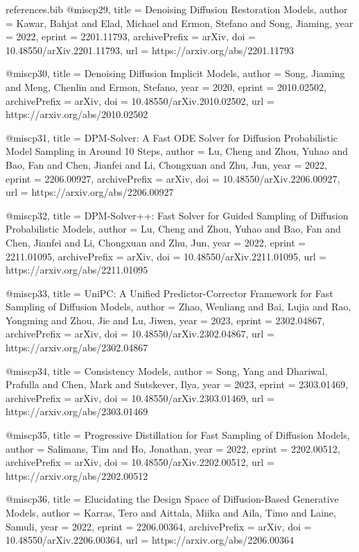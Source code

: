 \begin{filecontents*}{references.bib}
@misc{p29,
  title = {{Denoising Diffusion Restoration Models}},
  author = {Kawar, Bahjat and Elad, Michael and Ermon, Stefano and Song, Jiaming},
  year = {2022},
  eprint = {2201.11793},
  archivePrefix = {arXiv},
  doi = {10.48550/arXiv.2201.11793},
  url = {https://arxiv.org/abs/2201.11793}
}

@misc{p30,
  title = {{Denoising Diffusion Implicit Models}},
  author = {Song, Jiaming and Meng, Chenlin and Ermon, Stefano},
  year = {2020},
  eprint = {2010.02502},
  archivePrefix = {arXiv},
  doi = {10.48550/arXiv.2010.02502},
  url = {https://arxiv.org/abs/2010.02502}
}

@misc{p31,
  title = {{DPM-Solver: A Fast ODE Solver for Diffusion Probabilistic Model Sampling in Around 10 Steps}},
  author = {Lu, Cheng and Zhou, Yuhao and Bao, Fan and Chen, Jianfei and Li, Chongxuan and Zhu, Jun},
  year = {2022},
  eprint = {2206.00927},
  archivePrefix = {arXiv},
  doi = {10.48550/arXiv.2206.00927},
  url = {https://arxiv.org/abs/2206.00927}
}

@misc{p32,
  title = {{DPM-Solver++: Fast Solver for Guided Sampling of Diffusion Probabilistic Models}},
  author = {Lu, Cheng and Zhou, Yuhao and Bao, Fan and Chen, Jianfei and Li, Chongxuan and Zhu, Jun},
  year = {2022},
  eprint = {2211.01095},
  archivePrefix = {arXiv},
  doi = {10.48550/arXiv.2211.01095},
  url = {https://arxiv.org/abs/2211.01095}
}

@misc{p33,
  title = {{UniPC: A Unified Predictor-Corrector Framework for Fast Sampling of Diffusion Models}},
  author = {Zhao, Wenliang and Bai, Lujia and Rao, Yongming and Zhou, Jie and Lu, Jiwen},
  year = {2023},
  eprint = {2302.04867},
  archivePrefix = {arXiv},
  doi = {10.48550/arXiv.2302.04867},
  url = {https://arxiv.org/abs/2302.04867}
}

@misc{p34,
  title = {{Consistency Models}},
  author = {Song, Yang and Dhariwal, Prafulla and Chen, Mark and Sutskever, Ilya},
  year = {2023},
  eprint = {2303.01469},
  archivePrefix = {arXiv},
  doi = {10.48550/arXiv.2303.01469},
  url = {https://arxiv.org/abs/2303.01469}
}

@misc{p35,
  title = {{Progressive Distillation for Fast Sampling of Diffusion Models}},
  author = {Salimans, Tim and Ho, Jonathan},
  year = {2022},
  eprint = {2202.00512},
  archivePrefix = {arXiv},
  doi = {10.48550/arXiv.2202.00512},
  url = {https://arxiv.org/abs/2202.00512}
}

@misc{p36,
  title = {{Elucidating the Design Space of Diffusion-Based Generative Models}},
  author = {Karras, Tero and Aittala, Miika and Aila, Timo and Laine, Samuli},
  year = {2022},
  eprint = {2206.00364},
  archivePrefix = {arXiv},
  doi = {10.48550/arXiv.2206.00364},
  url = {https://arxiv.org/abs/2206.00364}
}


\end{filecontents*}
